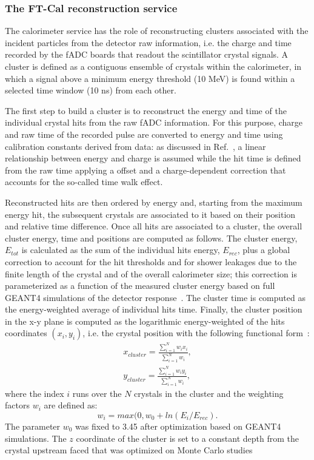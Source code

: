 \documentclass[3p,times,twocolumn]{elsarticle}
\begin{document}
\subsubsection{The FT-Cal reconstruction service}
The calorimeter service has the role of reconstructing clusters associated with the incident particles from the detector raw information, i.e. the charge and time recorded by the fADC boards that readout the scintillator crystal signals. A cluster is defined as a contiguous ensemble of crystals within the calorimeter, in which a signal above a minimum energy threshold (10 MeV) is found within a selected time window (10 ns) from each other.

The first step to build a cluster is to reconstruct the energy and time of the individual crystal hits from the raw fADC information. For this purpose, charge and raw time of the recorded pulse are converted to energy and time using calibration constants derived from data: as discussed in Ref.~\cite{ft}, a linear relationship between energy and charge is assumed while the hit time is defined from the raw time applying a offset and a charge-dependent correction that accounts for the so-called time walk effect.

Reconstructed hits are then ordered by energy and, starting from the maximum energy hit, the subsequent crystals are associated to it based on their position and relative time difference. Once all hits are associated to a cluster, the overall cluster energy, time and positions are computed as follows. The cluster energy, $E_{tot}$ is calculated as the sum of the individual hits energy, $E_{rec}$, plus a global correction to account for the hit thresholds and for shower leakages due to the finite length of the crystal and of the overall calorimeter size; this correction is parameterized as a function of the measured cluster energy based on full GEANT4 simulations of the detector response~\cite{ft}. The cluster time is computed as the energy-weighted average of individual hits time. Finally, the cluster position in the x-y plane is computed as the logarithmic energy-weighted of the hits coordinates $(x_i,y_i)$, i.e. the crystal position with the following functional form~\cite{ic}:
\begin{eqnarray*}
x_{cluster} = \frac{\sum_{i=1}^N w_i x_i}{\sum_{i=1}^N w_i},\\
y_{cluster} = \frac{\sum_{i=1}^N w_i y_i}{\sum_{i=1}^N w_i},
\end{eqnarray*}
where the index $i$ runs over the $N$ crystals in the cluster and the weighting factors $w_i$ are defined as:
\begin{equation}
w_i=max(0,w_0+ln(E_i/E_{rec}).
\end{equation}
The parameter $w_0$ was fixed to 3.45 after optimization based on GEANT4 simulations. The $z$ coordinate of the cluster is set to a constant depth from the crystal upstream faced that was optimized on Monte Carlo studies
\end{document}
